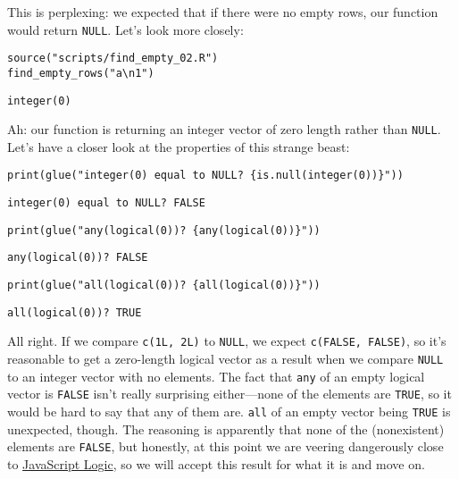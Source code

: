 This is perplexing:
we expected that if there were no empty rows,
our function would return \texttt{NULL}.
Let's look more closely:

\begin{lstlisting}
source("scripts/find_empty_02.R")
find_empty_rows("a\n1")
\end{lstlisting}

\begin{lstlisting}
integer(0)
\end{lstlisting}

\noindent
Ah:
our function is returning an integer vector of zero length rather than \texttt{NULL}.
Let's have a closer look at the properties of this strange beast:

\begin{lstlisting}
print(glue("integer(0) equal to NULL? {is.null(integer(0))}"))
\end{lstlisting}

\begin{lstlisting}
integer(0) equal to NULL? FALSE
\end{lstlisting}

\begin{lstlisting}
print(glue("any(logical(0))? {any(logical(0))}"))
\end{lstlisting}

\begin{lstlisting}
any(logical(0))? FALSE
\end{lstlisting}

\begin{lstlisting}
print(glue("all(logical(0))? {all(logical(0))}"))
\end{lstlisting}

\begin{lstlisting}
all(logical(0))? TRUE
\end{lstlisting}

All right.
If we compare \texttt{c(1L, 2L)} to \texttt{NULL}, we expect \texttt{c(FALSE, FALSE)},
so it's reasonable to get a zero-length logical vector as a result
when we compare \texttt{NULL} to an integer vector with no elements.
The fact that \texttt{any} of an empty logical vector is \texttt{FALSE}
isn't really surprising either---none of the elements are \texttt{TRUE},
so it would be hard to say that any of them are.
\texttt{all} of an empty vector being \texttt{TRUE} is unexpected, though.
The reasoning is apparently that none of the (nonexistent) elements are \texttt{FALSE},
but honestly,
at this point we are veering dangerously close to \href{https://www.destroyallsoftware.com/talks/wat}{JavaScript Logic},
so we will accept this result for what it is and move on.

